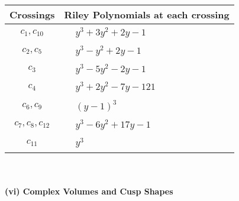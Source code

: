 \documentclass[1p]{elsarticle_modified}
\theoremstyle{definition}
\begin{document}
\begin{tabular}{m{50pt}|m{274pt}}
Crossings & \hspace{64pt}Riley Polynomials at each crossing \\
\hline $$\begin{aligned}c_{1},c_{10}\end{aligned}$$&$\begin{aligned}
&y^3+3 y^2+2 y-1
\end{aligned}$\\
\hline $$\begin{aligned}c_{2},c_{5}\end{aligned}$$&$\begin{aligned}
&y^3- y^2+2 y-1
\end{aligned}$\\
\hline $$\begin{aligned}c_{3}\end{aligned}$$&$\begin{aligned}
&y^3-5 y^2-2 y-1
\end{aligned}$\\
\hline $$\begin{aligned}c_{4}\end{aligned}$$&$\begin{aligned}
&y^3+2 y^2-7 y-121
\end{aligned}$\\
\hline $$\begin{aligned}c_{6},c_{9}\end{aligned}$$&$\begin{aligned}
&(y-1)^3
\end{aligned}$\\
\hline $$\begin{aligned}c_{7},c_{8},c_{12}\end{aligned}$$&$\begin{aligned}
&y^3-6 y^2+17 y-1
\end{aligned}$\\
\hline $$\begin{aligned}c_{11}\end{aligned}$$&$\begin{aligned}
&y^3
\end{aligned}$\\
\hline
\end{tabular}\\~\\
\newpage\flushleft \textbf{(vi) Complex Volumes and Cusp Shapes}
\end{document}
